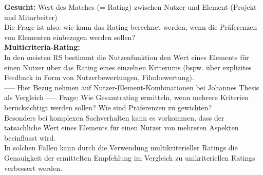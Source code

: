 \textbf{Gesucht:} Wert des Matches (= Rating) zwischen Nutzer und Element (Projekt und Mitarbeiter)\\
Die Frage ist also: wie kann das Rating berechnet werden, wenn die Präferenzen von Elementen einbezogen werden sollen?\\

\textbf{Multicriteria-Rating:}\\
In den meisten RS bestimmt die Nutzenfunktion den Wert eines Elements für einen Nutzer über das Rating eines einzelnen Kriterums (bspw. über explizites Feedback in Form von Nutzerbewertungen, Filmbewertung).\\ %
----- Hier Bezug nehmen auf Nutzer-Element-Kombinationen bei Johannes Thesis als Vergleich -----
Frage: Wie Gesamtrating ermitteln, wenn mehrere Kriterien berücksichtigt werden sollen? Wie sind Präferenzen zu gewichten?\\ %
Besonders bei komplexen Sachverhalten kann es vorkommen, dass der tatsächliche Wert eines Elements für einen Nutzer von mehreren Aspekten beeinflusst wird.\\ %
In solchen Fällen kann durch die Verwendung multikriterieller Ratings die Genauigkeit der ermittelten Empfehlung im Vergleich zu unikriteriellen Ratings verbessert werden.\\ %

